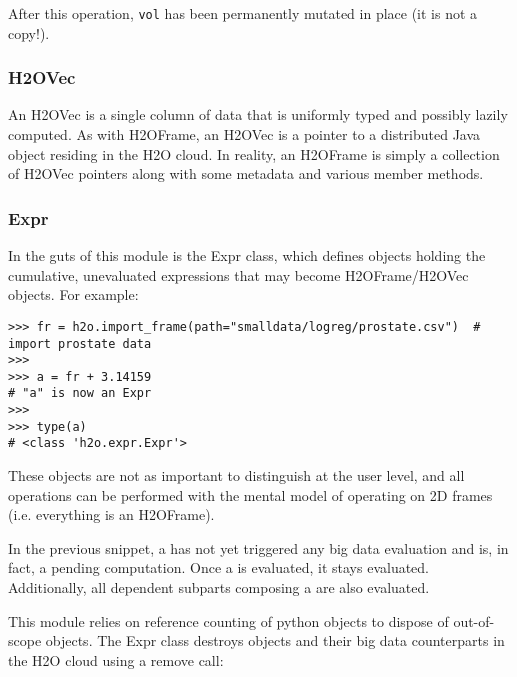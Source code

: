 After this operation, \texttt{vol} has been permanently mutated in place (it is not a copy!).





%

\subsubsection{H2OVec}

An H2OVec is a single column of data that is uniformly typed and possibly lazily computed. As with H2OFrame, an H2OVec is a pointer to a distributed Java object residing in the H2O cloud. In reality, an H2OFrame is simply a collection of H2OVec pointers along with some metadata and various member methods.

\subsubsection{Expr}

In the guts of this module is the Expr class, which defines objects holding the cumulative, unevaluated expressions that may become H2OFrame/H2OVec objects. For example:

\begin{lstlisting}[style=python]
>>> fr = h2o.import_frame(path="smalldata/logreg/prostate.csv")  # import prostate data
>>>
>>> a = fr + 3.14159                         
# "a" is now an Expr
>>>
>>> type(a)                                        
# <class 'h2o.expr.Expr'>
\end{lstlisting}

These objects are not as important to distinguish at the user level, and all operations can be performed with the mental model of operating on 2D frames (i.e. everything is an H2OFrame).

In the previous snippet, a has not yet triggered any big data evaluation and is, in fact, a pending computation. Once a is evaluated, it stays evaluated. Additionally, all dependent subparts composing a are also evaluated.

This module relies on reference counting of python objects to dispose of out-of-scope objects. The Expr class destroys objects and their big data counterparts in the H2O cloud using a remove call:


